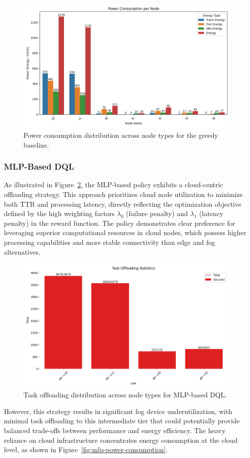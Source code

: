 \documentclass[preprint,3p,authoryear]{elsarticle}
\begin{document}
\begin{figure}[H]
    \centering
    \includegraphics[width=0.5\linewidth]{figs/Greedy/power_consumption_per_node.png}
    \caption{Power consumption distribution across node types for the greedy baseline.}
    \label{fig:greedy-power-consumption}
\end{figure}


\subsubsection{MLP-Based DQL}\label{subsubsec:mlp-DQL-analysis}

As illustrated in Figure~\ref{fig:mlp-task-offloading-stats}, the MLP-based policy exhibits a cloud-centric offloading strategy. This approach prioritizes cloud node utilization to minimize both TTR and processing latency, directly reflecting the optimization objective defined by the high weighting factors $\lambda_0$ (failure penalty) and $\lambda_1$ (latency penalty) in the reward function. The policy demonstrates clear preference for leveraging superior computational resources in cloud nodes, which possess higher processing capabilities and more stable connectivity than edge and fog alternatives.

\begin{figure}[H]
    \centering
    \includegraphics[width=0.5\linewidth]{figs/MLP/task_offloading_statistics.png}
    \caption{Task offloading distribution across node types for MLP-based DQL.}
    \label{fig:mlp-task-offloading-stats}
\end{figure}

However, this strategy results in significant fog device underutilization, with minimal task offloading to this intermediate tier that could potentially provide balanced trade-offs between performance and energy efficiency. The heavy reliance on cloud infrastructure concentrates energy consumption at the cloud level, as shown in Figure~\ref{fig:mlp-power-consumption}.
\end{document}
